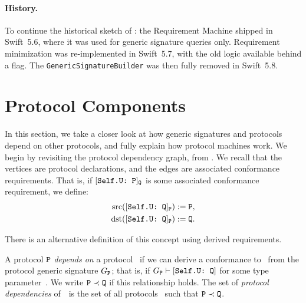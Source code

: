 \documentclass[../generics]{subfiles}
\begin{document}
\paragraph{History.}
To continue the historical sketch of : the Requirement Machine shipped in Swift~5.6, where it was used for generic signature queries only. Requirement minimization was re-implemented in Swift~5.7, with the old logic available behind a flag. The \texttt{GenericSignatureBuilder} was then fully removed in Swift~5.8.

\section{Protocol Components}\label{protocol component}

In this section, we take a closer look at how generic signatures and protocols depend on other protocols, and fully explain how protocol machines work. We begin by revisiting the protocol dependency graph, from . We recall that the vertices are protocol declarations, and the edges are associated conformance requirements. That is, if $[\texttt{Self.U:~P}]_{\texttt{Q}}$ is some associated conformance requirement, we define:
\begin{align*}
\operatorname{src}([\texttt{Self.U:~Q}]_{\texttt{P}})&:=\texttt{P},\\
\operatorname{dst}([\texttt{Self.U:~Q}]_{\texttt{P}})&:=\texttt{Q}.
\end{align*}

There is an alternative definition of this concept using derived requirements.
\begin{definition}
A protocol $\texttt{P}$ \emph{depends on} a protocol \tQ\ if we can derive a conformance to \tQ\ from the protocol generic signature $G_{\texttt{P}}$; that is, if $G_{\texttt{P}}\vdash[\texttt{Self.U:~Q}]$ for some type parameter~\SelfU. We write $\texttt{P}\prec\texttt{Q}$ if this relationship holds. The set of \emph{protocol dependencies} of~\tP\ is the set of all protocols \tQ\ such that $\texttt{P}\prec\texttt{Q}$.
\end{definition}
\end{document}
